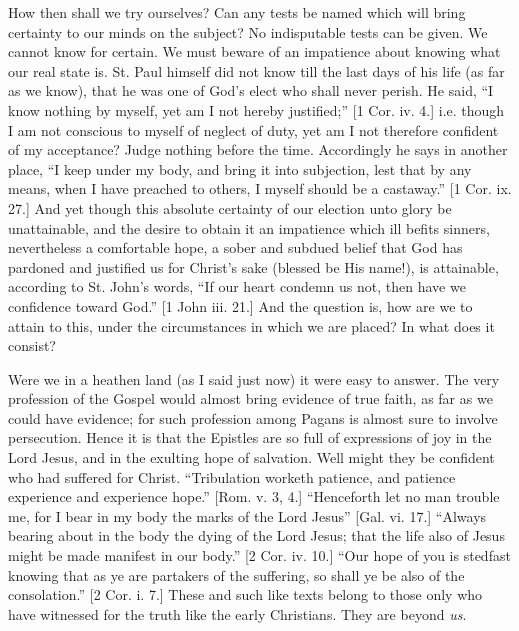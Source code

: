 How then shall we try ourselves? Can any tests be
named which will bring certainty to our minds on the
subject? No indisputable tests can be given. We cannot
know for certain. We must beware of an impatience about
knowing what our real state is. St. Paul himself did not
know till the last days of his life (as far as we know),
that he was one of God's elect who shall never perish. He
said, ``I know nothing by myself, yet am I not hereby
justified;'' [1 Cor. iv. 4.] i.e. though I am not
conscious to myself of neglect of duty, yet am I not therefore confident of my acceptance? Judge nothing
before the time. Accordingly he says in another place,
``I keep under my body, and bring it into subjection,
lest that by any means, when I have preached to others, I
myself should be a castaway.'' [1 Cor. ix. 27.] And
yet though this absolute certainty of our election unto
glory be unattainable, and the desire to obtain it an
impatience which ill befits sinners, nevertheless a
comfortable hope, a sober and subdued belief that God has
pardoned and justified us for Christ's sake (blessed be
His name!), is attainable, according to St. John's words,
``If our heart condemn us not, then have we
confidence toward God.'' [1 John iii. 21.] And the
question is, how are we to attain to this, under the
circumstances in which we are placed? In what does it
consist?

Were we in a heathen land (as I said just now) it were
easy to answer. The very profession of the Gospel would
almost bring evidence of true faith, as far as we could
have evidence; for such profession among Pagans is almost
sure to involve persecution. Hence it is that the
Epistles are so full of expressions of joy in the Lord
Jesus, and in the exulting hope of salvation. Well might
they be confident who had suffered for Christ.
``Tribulation worketh patience, and patience
experience and experience hope.'' [Rom. v. 3, 4.]
``Henceforth let no man trouble me, for I bear in my
body the marks of the Lord Jesus'' [Gal. vi. 17.]
``Always bearing about in the body the dying of the
Lord Jesus; that the life also of Jesus might be made
manifest in our body.'' [2 Cor. iv. 10.] ``Our
hope of you is stedfast knowing that as ye are partakers
of the suffering, so shall ye be also of the
consolation.'' [2 Cor. i. 7.] These and such like
texts belong to those only who have witnessed for the
truth like the early Christians. They are beyond \emph{us}.

